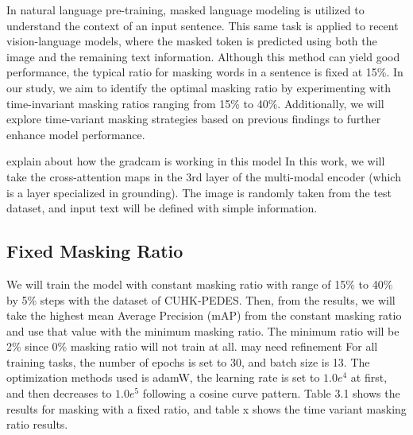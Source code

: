 In natural language pre-training, masked language modeling is utilized to understand the context of an input sentence. This same task is applied to recent vision-language models, where the masked token is predicted using both the image and the remaining text information. Although this method can yield good performance, the typical ratio for masking words in a sentence is fixed at 15\%. In our study, we aim to identify the optimal masking ratio by experimenting with time-invariant masking ratios ranging from 15\% to 40\%. Additionally, we will explore time-variant masking strategies based on previous findings to further enhance model performance.


{\color{red} explain about how the gradcam is working in this model}
In this work, we will take the cross-attention maps in the 3rd layer of the multi-modal encoder (which is a layer specialized in grounding). The image is randomly taken from the test dataset, and input text will be defined with simple information.

\subsection{Fixed Masking Ratio}
We will train the model with constant masking ratio with range of 15\% to 40\% by 5\% steps with the dataset of CUHK-PEDES. Then, from the results, we will take the highest mean Average Precision (mAP) from the constant masking ratio and use that value with the minimum masking ratio. The minimum ratio will be 2\% since 0\% masking ratio will not train at all. 
{\color{red} may need refinement}
For all training tasks, the number of epochs is set to 30, and batch size is 13. The optimization methods used is adamW, the learning rate is set to $1.0e^4$ at first, and then decreases to $1.0e^5$ following a cosine curve pattern. Table 3.1 shows the results for masking with a fixed ratio, and table x shows the time variant masking ratio results.


